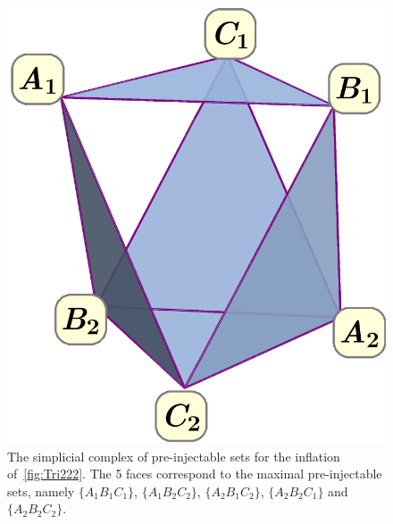 \begin{figure}[t]
\begin{minipage}[t]{0.3\linewidth}
\includegraphics[scale=0.25]{simplicialcomplex.pdf}
\caption{The simplicial complex of pre-injectable sets for the inflation of~\cref{fig:Tri222}. The 5 faces correspond to the maximal pre-injectable sets, namely $\{A_1 B_1 C_1\}$, $\{A_1 B_2 C_2\}$, $\{A_2 B_1 C_2\}$, $\{A_2 B_2 C_1\}$ and $\{A_2 B_2 C_2\}$.}\label{fig:simplicialcomplex222}
\end{minipage}
\end{figure}


